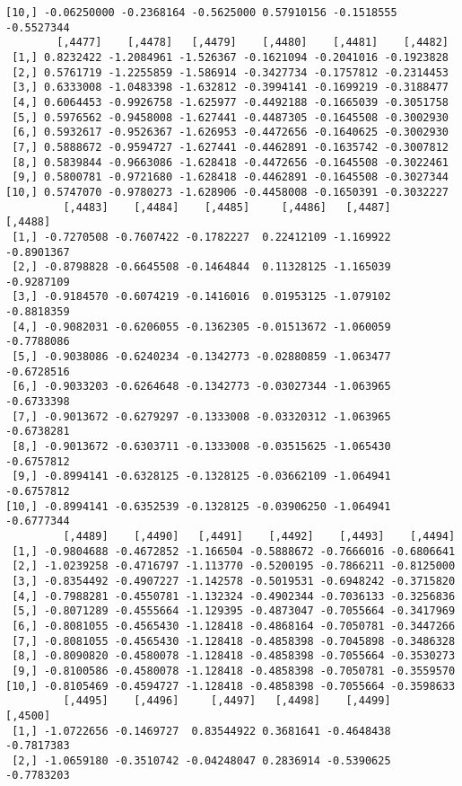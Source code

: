 \documentclass[
  letterpaper,
  DIV=11,
  numbers=noendperiod]{scrreprt}
\begin{document}
\begin{verbatim}
[10,] -0.06250000 -0.2368164 -0.5625000 0.57910156 -0.1518555 -0.5527344
        [,4477]    [,4478]   [,4479]    [,4480]    [,4481]    [,4482]
 [1,] 0.8232422 -1.2084961 -1.526367 -0.1621094 -0.2041016 -0.1923828
 [2,] 0.5761719 -1.2255859 -1.586914 -0.3427734 -0.1757812 -0.2314453
 [3,] 0.6333008 -1.0483398 -1.632812 -0.3994141 -0.1699219 -0.3188477
 [4,] 0.6064453 -0.9926758 -1.625977 -0.4492188 -0.1665039 -0.3051758
 [5,] 0.5976562 -0.9458008 -1.627441 -0.4487305 -0.1645508 -0.3002930
 [6,] 0.5932617 -0.9526367 -1.626953 -0.4472656 -0.1640625 -0.3002930
 [7,] 0.5888672 -0.9594727 -1.627441 -0.4462891 -0.1635742 -0.3007812
 [8,] 0.5839844 -0.9663086 -1.628418 -0.4472656 -0.1645508 -0.3022461
 [9,] 0.5800781 -0.9721680 -1.628418 -0.4462891 -0.1645508 -0.3027344
[10,] 0.5747070 -0.9780273 -1.628906 -0.4458008 -0.1650391 -0.3032227
         [,4483]    [,4484]    [,4485]     [,4486]   [,4487]    [,4488]
 [1,] -0.7270508 -0.7607422 -0.1782227  0.22412109 -1.169922 -0.8901367
 [2,] -0.8798828 -0.6645508 -0.1464844  0.11328125 -1.165039 -0.9287109
 [3,] -0.9184570 -0.6074219 -0.1416016  0.01953125 -1.079102 -0.8818359
 [4,] -0.9082031 -0.6206055 -0.1362305 -0.01513672 -1.060059 -0.7788086
 [5,] -0.9038086 -0.6240234 -0.1342773 -0.02880859 -1.063477 -0.6728516
 [6,] -0.9033203 -0.6264648 -0.1342773 -0.03027344 -1.063965 -0.6733398
 [7,] -0.9013672 -0.6279297 -0.1333008 -0.03320312 -1.063965 -0.6738281
 [8,] -0.9013672 -0.6303711 -0.1333008 -0.03515625 -1.065430 -0.6757812
 [9,] -0.8994141 -0.6328125 -0.1328125 -0.03662109 -1.064941 -0.6757812
[10,] -0.8994141 -0.6352539 -0.1328125 -0.03906250 -1.064941 -0.6777344
         [,4489]    [,4490]   [,4491]    [,4492]    [,4493]    [,4494]
 [1,] -0.9804688 -0.4672852 -1.166504 -0.5888672 -0.7666016 -0.6806641
 [2,] -1.0239258 -0.4716797 -1.113770 -0.5200195 -0.7866211 -0.8125000
 [3,] -0.8354492 -0.4907227 -1.142578 -0.5019531 -0.6948242 -0.3715820
 [4,] -0.7988281 -0.4550781 -1.132324 -0.4902344 -0.7036133 -0.3256836
 [5,] -0.8071289 -0.4555664 -1.129395 -0.4873047 -0.7055664 -0.3417969
 [6,] -0.8081055 -0.4565430 -1.128418 -0.4868164 -0.7050781 -0.3447266
 [7,] -0.8081055 -0.4565430 -1.128418 -0.4858398 -0.7045898 -0.3486328
 [8,] -0.8090820 -0.4580078 -1.128418 -0.4858398 -0.7055664 -0.3530273
 [9,] -0.8100586 -0.4580078 -1.128418 -0.4858398 -0.7050781 -0.3559570
[10,] -0.8105469 -0.4594727 -1.128418 -0.4858398 -0.7055664 -0.3598633
         [,4495]    [,4496]     [,4497]   [,4498]    [,4499]    [,4500]
 [1,] -1.0722656 -0.1469727  0.83544922 0.3681641 -0.4648438 -0.7817383
 [2,] -1.0659180 -0.3510742 -0.04248047 0.2836914 -0.5390625 -0.7783203

\end{verbatim}
\end{document}
